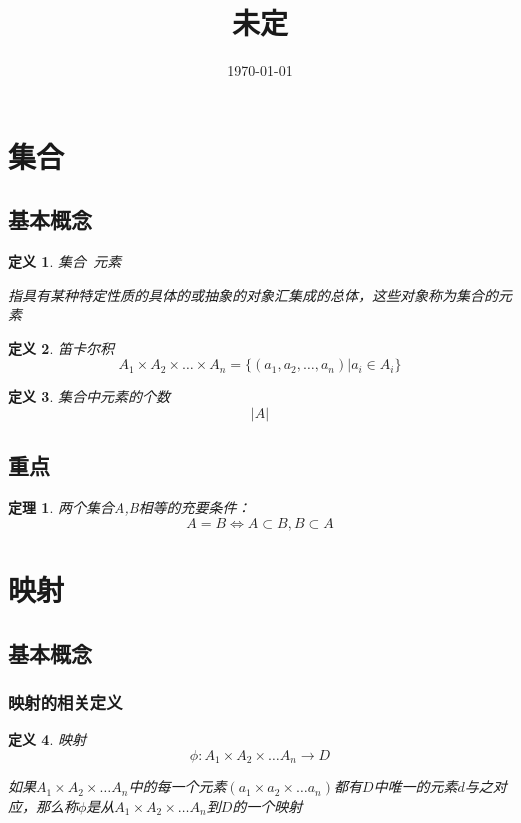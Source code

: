 \documentclass[a4paper]{ctexart}
\title{未定}
\date{\today}
\newtheorem{theorem}{定理}[section]
\newtheorem{definition}{定义}[subsection]
\begin{document}
	\maketitle

	\tableofcontents
\section{集合}
	\subsection{基本概念}
	\begin{definition}
	集合\ 元素
	
	指具有某种特定性质的具体的或抽象的对象汇集成的总体，这些对象称为集合的元素
	

	\end{definition}
	\begin{definition}{笛卡尔积}
	\[ A_1\times A_2 \times \dots \times A_n=\{(a_1,a_2,\dots,a_n)|a_i\in A_i\}\]
	\end{definition}

	\begin{definition}
		集合中元素的个数\[|A|\]
	\end{definition}


	\subsection{重点}
	\begin{theorem}
	两个集合A,B相等的充要条件：\[A=B\iff A\subset B,B\subset A\]
	\end{theorem}

\section{映射}
	\subsection{基本概念}
		\subsubsection{映射的相关定义}
		
		
	\begin{definition}
		映射
		\[\phi{:}A_1\times A_2\times \dots A_n \to D\]
		
		如果$A_1\times A_2\times \dots A_n$中的每一个元素$(a_1\times a_2\times \dots a_n)$都有$D$中唯一的元素$d$与之对应，那么称$\phi $是从$A_1\times A_2\times \dots A_n$到$D$的一个映射
	\end{definition}
\end{document}
